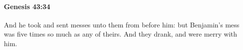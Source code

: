 
		\paragraph{Genesis 43:34} %
			\label{GENESIS-43-34}

			And he took and sent messes unto them from before him: but Benjamin's mess was five times so much as any of theirs. And they drank, and were merry with him.

